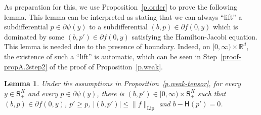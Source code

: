 \documentclass[10pt]{amsart}
\newtheorem{lemm}[theo]{Lemma}\newtheorem{prop}[theo]{Proposition}\newtheorem{coro}[theo]{Corollary}\newtheorem{conj}[theo]{Conjecture}
\theoremstyle{definition}\newtheorem{defi}[theo]{Definition}\newtheorem{rema}[theo]{Remark}\newtheorem{exam}[theo]{Example}\newtheorem{exem}[theo]{Example}\newtheorem{nota}[theo]{Notation}
\newcommand{\R}{\mathbb{R}}
\renewcommand{\S}{\mathbf{S}}
\newcommand{\Lip}{\mathrm{Lip}}
\renewcommand{\H}{\mathsf{H}}
\renewcommand{\leq}{\leqslant}
\renewcommand{\geq}{\geqslant}
\begin{document}
As preparation for this, we use Proposition~\ref{p.order} to prove the following lemma. This lemma can be interpreted as stating that we can always ``lift'' a subdifferential $p\in\partial\psi(y)$ to a subdifferential $(b,p)\in\partial f(0,y)$ which is dominated by some $(b,p')\in\partial f(0,y)$ satisfying the Hamilton-Jacobi equation. This lemma is needed due to the presence of boundary. Indeed, on $[0,\infty)\times \R^d$, the existence of such a ``lift'' is automatic, which can be seen in Step~\ref{proof-propA.2step2} of the proof of Proposition~\ref{p.weak}.


\begin{lemm}\label{l.lift}
Under the assumptions in Proposition~\ref{p.weak-tensor}, for every $y\in\S^K_+$ and every $p\in \partial \psi(y)$, there is $(b,p')\in [0,\infty)\times\S^K_+$ such that $(b,p)\in \partial f(0,y)$, $p'\geq p$, $|(b,p')|\leq \|f\|_{\Lip}$ and $b-\H(p')= 0$.
\end{lemm}
\end{document}
